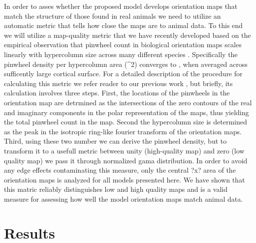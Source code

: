 \documentclass[a4paper,10pt]{article}
\begin{document}
In order to asses whether the proposed model develops orientation maps that match the structure of those found in real 
animals we need to utilize an automatic metric that tells how close the maps are to animal data. To this end we will 
utilize a map-quality metric that we have recently developed \cite{Stevens2013} based on the empirical observation that pinwheel count 
in biological orientation maps scales linearly with hypercolumn size across many different species \cite{Kaschube2010}.
Specifically the pinwheel density per hypercolumn area (\Lambda^2) converges to \pi, when averaged across sufficently 
large cortical surface. For a detailed description of the procedure for calculating this metric we refer reader to 
our previous work \cite{Stevens2013}, but briefly, its calculation involves three steps. First, the locations of the pinwheels
in the orientation map are detrmined as the intersections of the zero contours of the real and imaginary 
components in the polar representation of the maps, thus yielding the total pinwheel count in the map. Second the 
hypercolumn size is determined as the peak in the isotropic ring-like fourier transform of the orientation maps.
Third, using these two number we can derive the pinwheel density, but to transform it to a usefull metric between 
unity (high-quality map) and zero (low quality map) we pass it through normalized gama distribution. In order to 
avoid any edge effects contaminating this measure, only the central ?x? area of the orientation maps is analyzed for
all models presented here. We have shown that this matric reliably distinguishes low and high quality maps \cite{Stevens2013}
and is a valid measure for assessing how well the model orientation maps match animal data.

\section{Results}
\end{document}
